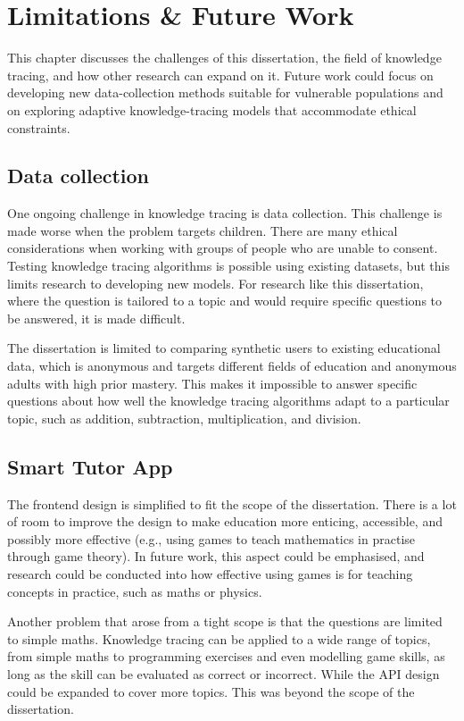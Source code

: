 \chapter{Limitations \& Future Work}

This chapter discusses the challenges of this dissertation, the field of knowledge tracing, and how other research can expand on it. Future work could focus on developing new data-collection methods suitable for vulnerable populations and on exploring adaptive knowledge-tracing models that accommodate ethical constraints.

\section{Data collection}

One ongoing challenge in knowledge tracing is data collection. This challenge is made worse when the problem targets children. There are many ethical considerations when working with groups of people who are unable to consent. Testing knowledge tracing algorithms is possible using existing datasets, but this limits research to developing new models. For research like this dissertation, where the question is tailored to a topic and would require specific questions to be answered, it is made difficult.

The dissertation is limited to comparing synthetic users to existing educational data, which is anonymous and targets different fields of education and anonymous adults with high prior mastery. This makes it impossible to answer specific questions about how well the knowledge tracing algorithms adapt to a particular topic, such as addition, subtraction, multiplication, and division.

\section{Smart Tutor App}

The frontend design is simplified to fit the scope of the dissertation. There is a lot of room to improve the design to make education more enticing, accessible, and possibly more effective (e.g., using games to teach mathematics in practise through game theory). In future work, this aspect could be emphasised, and research could be conducted into how effective using games is for teaching concepts in practice, such as maths or physics.

Another problem that arose from a tight scope is that the questions are limited to simple maths. Knowledge tracing can be applied to a wide range of topics, from simple maths to programming exercises and even modelling game skills, as long as the skill can be evaluated as correct or incorrect. While the API design could be expanded to cover more topics. This was beyond the scope of the dissertation.